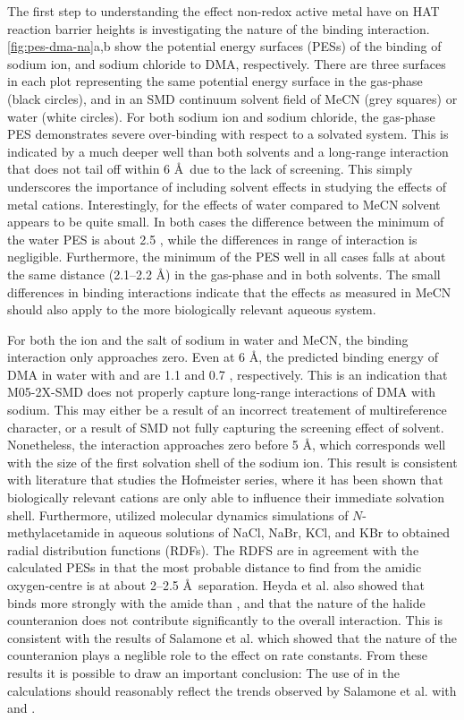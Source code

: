 The first step to understanding the effect non-redox active metal have on HAT
reaction barrier heights is investigating the nature of the binding
interaction. \ref{fig:pes-dma-na}a,b show the potential energy surfaces (PESs)
of the binding of sodium ion, and sodium chloride to DMA, respectively. There
are three surfaces in each plot representing the same potential energy surface
in the gas-phase (black circles), and in an SMD\cite{Marenich2009} continuum
solvent field of MeCN (grey squares) or water (white circles). For both sodium
ion and sodium chloride, the gas-phase PES demonstrates severe over-binding
with respect to a solvated system. This is indicated by a much deeper well than
both solvents and a long-range interaction that does not tail off within 6
\AA\ due to the lack of screening. This simply underscores the importance
of including solvent effects in studying the effects of metal cations.
Interestingly, for the effects of water compared to MeCN solvent appears to be
quite small. In both cases the difference between the minimum of the water PES
is about 2.5 \kcalmol, while the differences in range of interaction is
negligible. Furthermore, the minimum of the PES well in all cases falls at
about the same distance (2.1--2.2 \AA) in the gas-phase and in both solvents.
The small differences in binding interactions indicate that the effects as
measured in MeCN should also apply to the more biologically relevant aqueous
system. 

For both the ion and the salt of sodium in water and MeCN, the binding
interaction only approaches zero. Even at 6 \AA, the predicted binding energy
of DMA in water with  and  are 1.1 and 0.7 \kcalmol,
respectively. This is an indication that M05-2X-SMD does not properly capture
long-range interactions of DMA with sodium. This may either be a result of an
incorrect treatement of multireference character, or a result of SMD not fully
capturing the screening effect of solvent. Nonetheless, the interaction
approaches zero before 5 \AA, which corresponds well with the size of the first
solvation shell of the sodium ion.\cite{Degreve1996} This result is consistent
with literature that studies the Hofmeister series, where it has been shown
that biologically relevant cations are only able to influence their immediate
solvation shell.\cite{Omta2003, Funkner2011} Furthermore, \citet{Heyda2009}
utilized molecular dynamics simulations of $N$-methylacetamide in aqueous
solutions of NaCl, NaBr, KCl, and KBr to obtained radial distribution functions
(RDFs). The RDFS are in agreement with the calculated PESs in that the most
probable distance to find  from the amidic oxygen-centre is at about
2--2.5 \AA\ separation. Heyda et al. also showed that  binds more
strongly with the amide than , and that the nature of the halide
counteranion does not contribute significantly to the overall interaction. This
is consistent with the results of Salamone et al. which showed that the nature
of the counteranion plays a neglible role to the effect on rate
constants.\cite{Salamone2013a} From these results it is possible to draw an
important conclusion: The use of  in the calculations should
reasonably reflect the trends observed by Salamone et al.  with  and
.


